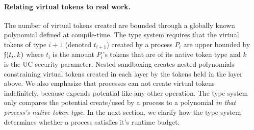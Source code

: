 \paragraph{Relating virtual tokens to real work.}
The number of virtual tokens created are bounded through a globally known
polynomial \GlobalF defined at compile-time.  The type system requires that the
virtual tokens of type $i+1$ (denoted $t_{i+1}$) created by a process $P_i$ are
upper bounded by $\mathfrak{f}(t_i, k)$ where $t_i$ is the amount $P_i$'s tokens
that are of its native token type and $k$ is the UC security parameter.  Nested
sandboxing creates nested polynomials constraining virtual tokens created in
each layer by the tokens held in the layer above.  We also emphasize that
processes can not create virtual tokens indefinitely, because
\inline{$\nwithdraw$} expends potential like any other operation.  The type
system only compares the potential create/used by a process to a polynomial
\emph{in that process's native token type}.  In the next section, we clarify
how the type system determines whether a process satisfies it's runtime budget.





